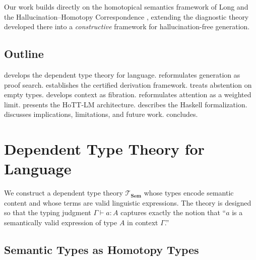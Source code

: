 \documentclass[11pt,a4paper]{article}
\theoremstyle{plain}
\theoremstyle{definition}
\theoremstyle{remark}
\newcommand{\Sem}{\mathbf{Sem}}
\begin{document}
Our work builds directly on the homotopical semantics framework of Long \cite{long2026homotopical} and the Hallucination--Homotopy Correspondence \cite{long2026hhc}, extending the diagnostic theory developed there into a \emph{constructive} framework for hallucination-free generation.

\subsection{Outline}

 develops the dependent type theory for language.
 reformulates generation as proof search.
 establishes the certified derivation framework.
 treats abstention on empty types.
 develops context as fibration.
 reformulates attention as a weighted limit.
 presents the HoTT-LM architecture.
 describes the Haskell formalization.
 discusses implications, limitations, and future work.
 concludes.

\section{Dependent Type Theory for Language}\label{sec:dependent}

We construct a dependent type theory $\mathcal{T}_{\Sem}$ whose types encode semantic content and whose terms are valid linguistic expressions.
The theory is designed so that the typing judgment $\Gamma \vdash a : A$ captures exactly the notion that ``$a$ is a semantically valid expression of type $A$ in context $\Gamma$.''

\subsection{Semantic Types as Homotopy Types}
\end{document}
